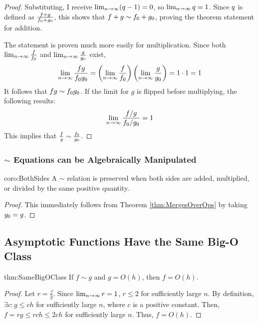 \begin{proof}
	Substituting, I receive $\lim_{n \to \infty} (q - 1) = 0$, so $\lim_{n \to \infty} q = 1$. Since $q$ is defined as $\frac{f + g}{f_0 + g_0}$, this shows that $f + g \sim f_0 + g_0$, proving the theorem statement for addition.
	
	The statement is proven much more easily for multiplication. Since both $\lim_{n \to \infty} \frac{f}{f_0}$ and $\lim_{n \to \infty} \frac{g}{g_0}$ exist,
	\begin{align*}
	\lim_{n \to \infty} \frac{fg}{f_0g_0} = \left( \lim_{n \to \infty} \frac{f}{f_0} \right) \left( \lim_{n \to \infty} \frac{g}{g_0} \right) = 1 \cdot 1 = 1
	\end{align*}
	It follows that $fg \sim f_0g_0$. If the limit for $g$ is flipped before multiplying, the following results:
	\begin{align*}
	\lim_{n \to \infty} \frac{f / g}{f_0 / g_0} = 1
	\end{align*}
	This implies that $\frac f g \sim \frac {f_0} {g_0}$.
\end{proof}

\subsubsection{$\sim$ Equations can be Algebraically Manipulated}

\begin{repcorollary}{coro:BothSides}
	A $\sim$ relation is preserved when both sides are added, multiplied, or divided by the same positive quantity.
\end{repcorollary}

\begin{proof}
	This immediately follows from Theorem \ref{thm:MergesOverOps} by taking $g_0 = g$.
\end{proof}

\subsection{Asymptotic Functions Have the Same Big-O Class}

\begin{reptheorem}{thm:SameBigOClass}
	If $f \sim g$ and $g = O(h)$, then $f = O(h)$.
\end{reptheorem}

\begin{proof}
	Let $r = \frac{f}{g}$. Since $\lim_{n \to \infty} r = 1$, $r \leq 2$ for sufficiently large $n$. By definition, $\exists c : g \leq c h$ for sufficiently large $n$, where $c$ is a positive constant. Then, $f = rg \leq rc h \leq 2c h$ for sufficiently large $n$. Thus, $f = O(h)$.
\end{proof}

